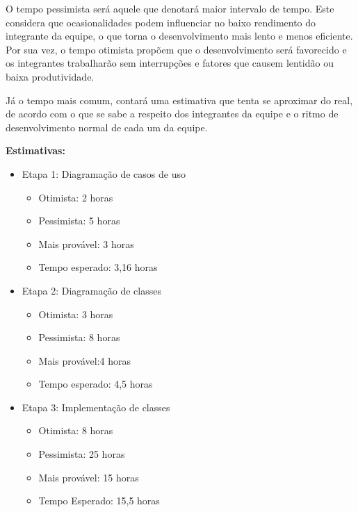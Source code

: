 \documentclass[12pt,a4paper]{report}
\begin{document}
	\quad O tempo pessimista será aquele que denotará maior intervalo de tempo. Este considera que ocasionalidades podem influenciar no baixo rendimento do integrante da equipe, o que torna o desenvolvimento mais lento e menos eficiente. Por sua vez, o tempo otimista propõem que o desenvolvimento será favorecido e os integrantes trabalharão sem interrupções e fatores que causem lentidão ou baixa produtividade. 
	
	\quad Já o tempo mais comum, contará uma estimativa que tenta se aproximar do real, de acordo com o que se sabe a respeito dos integrantes da equipe e o ritmo de desenvolvimento normal de cada um da equipe.
	
	\textbf{Estimativas:} 
	\begin{itemize}
		\item Etapa 1: Diagramação de casos de uso
		\begin{itemize}
			\item Otimista: 2 horas
			\item Pessimista: 5 horas
			\item Mais provável: 3 horas
			\item Tempo esperado: 3,16 horas
		\end{itemize}
		\item Etapa 2: Diagramação de classes
		
		\begin{itemize}
			\item Otimista: 3 horas
			\item Pessimista: 8 horas
			\item Mais provável:4 horas
			\item Tempo esperado: 4,5 horas
		\end{itemize}
			\item Etapa 3: Implementação de classes
		\begin{itemize}
				\item Otimista: 8 horas
				\item Pessimista: 25 horas
				\item Mais provável: 15 horas
				\item Tempo Esperado: 15,5 horas
				

\end{itemize}
\end{itemize}
\end{document}
